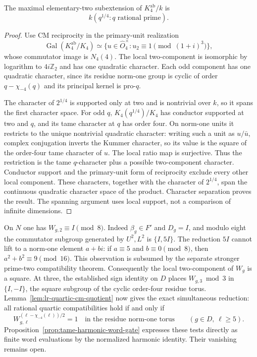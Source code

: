 \begin{lemma}\label{lem:lr-quartic-cm-quotient}
The maximal elementary-two subextension of
$K_4^{\mathrm{ab}}/k$ is
\[k(q^{1/4}:q\text{ rational prime}).\]
\end{lemma}
\begin{proof}
Use CM reciprocity in the primary-unit realization
\[
 \operatorname{Gal}(K_4^{\mathrm{ab}}/K_4)
 \simeq\{u\in\widehat O_4^\times:
                    u_2\equiv1\pmod{(1+i)^3}\},
\]
whose commutator image is $N_4(4)$.
The local two-component is isomorphic by logarithm to
$4i\mathbb Z_2$ and has one quadratic character.
Each odd component has one quadratic character, since its
residue norm-one group is cyclic of order
$q-\chi_{-4}(q)$ and its principal kernel is pro-$q$.

The character of $2^{1/4}$ is supported only at two and is
nontrivial over $k$, so it spans the first character space.
For odd $q$, $K_4(q^{1/4})/K_4$ has conductor supported at
two and $q$, and its tame character at $q$ has order four.
On norm-one units it restricts to the unique nontrivial
quadratic character: writing such a unit as $u/\bar u$,
complex conjugation inverts the Kummer character, so its value
is the square of the order-four tame character of $u$.
The local ratio map is surjective.
Thus the restriction is the tame $q$-character plus a possible
two-component character. Conductor support and the primary-unit
form of reciprocity exclude every other local component.
These characters, together with the character of $2^{1/4}$,
span the continuous quadratic character space of the product.
Character separation proves the result. The spanning argument
uses local support, not a comparison of infinite dimensions.
\end{proof}

On $N$ one has $W_{g,2}\equiv I\pmod8$. Indeed
$\beta_g\in F'$ and $D_g=I$, and modulo eight the commutator
subgroup generated by $U^2,L^2$ is $\{I,5I\}$.
The reduction $5I$ cannot lift to a norm-one element $a+bi$:
if $a\equiv5$ and $b\equiv0\pmod8$, then
$a^2+b^2\equiv9\pmod{16}$. This observation is subsumed by
the separate stronger prime-two compatibility theorem.
Consequently the local two-component of $W_g$ is a square.
At three, the established sign identity on $D$ places
$W_{g,3}\bmod3$ in $\{I,-I\}$, the square subgroup of the
cyclic order-four residue torus.
Lemma~\ref{lem:lr-quartic-cm-quotient} now gives the exact
simultaneous reduction: all rational quartic compatibilities
hold if and only if
\begin{equation}
 W_{g,\ell}^{(\ell-\chi_{-4}(\ell))/2}=1
 \quad\text{in the residue norm-one torus}
 \qquad(g\in D,\ \ell\ge5).
 \label{eq:lr-tame-quartic-test}
\end{equation}
Proposition~\ref{prop:tame-harmonic-word-gate} expresses these
tests directly as finite word evaluations by the normalized
harmonic identity. Their vanishing remains open.

